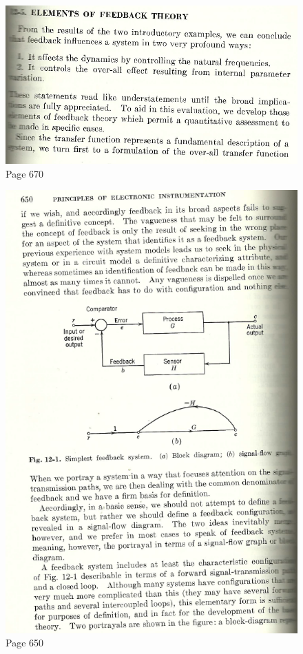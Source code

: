 \begin{figure}[!htb]
	\centering
	\includegraphics[scale=0.8]{lynch1.png}
	\caption{Page 670}
	\label{lynch1}
\end{figure}

\begin{figure}[!htb]
	\centering
	\includegraphics[scale=0.8]{lynch2.png}
	\caption{Page 650}
	\label{lynch2}
\end{figure}

